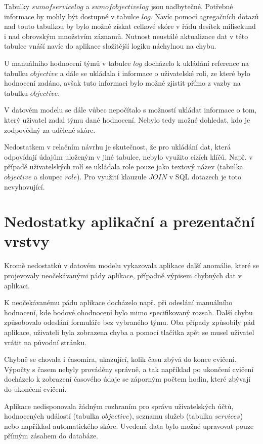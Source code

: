 \documentclass[
  digital, %
  twoside, %
  table,   %
  lof,     %
  lot,     %
]{fithesis3}
\begin{document}
Tabulky $sumofservicelog$ a $sumofobjectivelog$ jsou nadbytečné. Potřebné informace by mohly být dostupné v tabulce $log$. Navíc pomocí agregačních dotazů nad touto tabulkou by bylo možné získat celkové skóre v řádu desítek milisekund i nad obrovským množstvím záznamů. Nutnost neustálé aktualizace dat v této tabulce vnáší navíc do aplikace složitější logiku náchylnou na chybu. 

U manuálního hodnocení týmů v tabulce $log$ docházelo k ukládání reference na tabulku $objective$ a dále se ukládala i informace o uživatelské roli, ze které bylo hodnocení zadáno, avšak tuto informaci bylo možné zjistit přímo z vazby na tabulku $objective$.

V datovém modelu se dále vůbec nepočítalo s možností ukládat informace o tom, který uživatel zadal týmu dané hodnocení. Nebylo tedy možné dohledat, kdo je zodpovědný za udělené skóre.

Nedostatkem v relačním návrhu je skutečnost, že pro ukládání dat, která odpovídají údajům uloženým v jiné tabulce, nebylo využito cizích klíčů. Např. v případě uživatelských rolí se ukládala role pouze jako textový název  (tabulka $objective$ a sloupec $role$). Pro využití klauzule $JOIN$ v SQL dotazech je toto nevyhovující.

\section{Nedostatky aplikační a prezentační vrstvy}

Kromě nedostatků v datovém modelu vykazovala aplikace další anomálie, které se projevovaly neočekávanými pády aplikace, případně výpisem chybných dat v aplikaci.

K neočekávanému pádu aplikace docházelo např. při odeslání manuálního hodnocení, kde bodové ohodnocení bylo mimo specifikovaný rozsah. Další chybu způsobovalo odeslání formuláře bez vybraného týmu. Oba případy způsobily pád aplikace, uživateli byla zobrazena chyba a pomocí tlačítka zpět se musel uživatel vrátit na původní stránku.

Chybně se chovala i časomíra, ukazující, kolik času zbývá do konce cvičení. Výpočty s časem nebyly prováděny správně, a tak například po ukončení cvičení docházelo k zobrazení časového údaje se záporným počtem hodin, které zbývají do ukončení cvičení.

Aplikace nedisponovala žádným rozhraním pro správu uživatelských účtů, hodnocených událostí (tabulka $objective$), seznamu služeb (tabulka $services$) nebo například automatického skóre. Uvedená data bylo možné upravovat pouze přímým zásahem do databáze.
\end{document}
